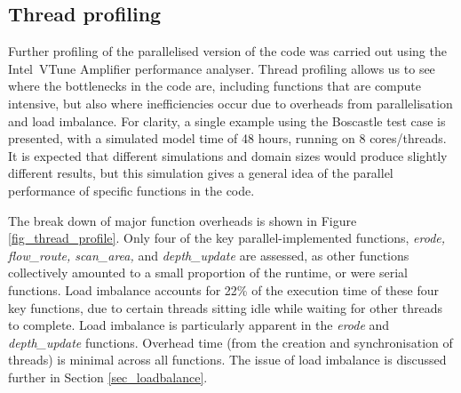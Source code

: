 %
%

\subsection{Thread profiling}

Further profiling of the parallelised version of the code was carried out using the Intel\textregistered \ VTune Amplifier performance analyser. Thread profiling allows us to see where the bottlenecks in the code are, including functions that are compute intensive, but also where inefficiencies occur due to overheads from parallelisation and load imbalance. For clarity, a single example using the Boscastle test case is presented, with a simulated model time of 48 hours, running on 8 cores/threads. It is expected that different simulations and domain sizes would produce slightly different results, but this simulation gives a general idea of the parallel performance of specific functions in the code.

The break down of major function overheads is shown in Figure \ref{fig_thread_profile}. Only four of the key parallel-implemented functions, \textit{erode, flow\_route, scan\_area,} and \textit{depth\_update} are assessed, as other functions collectively amounted to a small proportion of the runtime, or were serial functions. Load imbalance accounts for 22\% of the execution time of these four key functions, due to certain threads sitting idle while waiting for other threads to complete. Load imbalance is particularly apparent in the \textit{erode} and \textit{depth\_update} functions. Overhead time (from the creation and synchronisation of threads) is minimal across all functions. The issue of load imbalance is discussed further in Section \ref{sec_loadbalance}.

